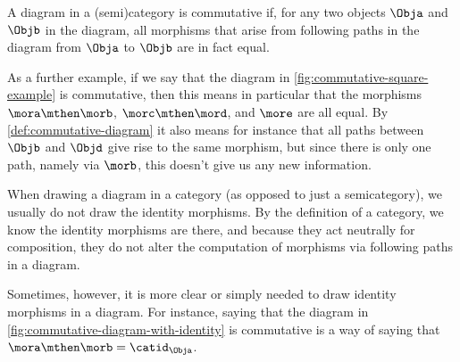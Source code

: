 \begin{marginfigure}
    \centering
    \caption{}
    \label{fig:commutative-diagram-example-prep}
\end{marginfigure}

\begin{marginfigure}
    \centering
    \caption{}
    \label{fig:commutative-diagram-example}
\end{marginfigure}

\begin{marginfigure}
    \centering
    \caption{}
    \label{fig:commutative-square-example}
\end{marginfigure}

\begin{marginfigure}
    \centering
    \caption{}
    \label{fig:commutative-diagram-with-identity}
\end{marginfigure}

\begin{definition}
    \label{def:commutative-diagram}
    A diagram in a (semi)category is commutative if, for any two objects $\Obja$ and $\Objb$ in the diagram, all morphisms that arise from following paths in the diagram from $\Obja$ to $\Objb$ are in fact equal.
\end{definition}

As a further example, if we say that the diagram in \cref{fig:commutative-square-example} is commutative, then this means in particular that the morphisms $\mora \mthen \morb$, $\morc \mthen \mord$, and $\more$ are all equal.
By \cref{def:commutative-diagram} it also means for instance that all paths between $\Objb$ and $\Objd$ give rise to the same morphism, but since there is only one path, namely via $\morb$, this doesn't give us any new information.

\begin{remark}
    When drawing a diagram in a category (as opposed to just a semicategory), we usually do not draw the identity morphisms.
    By the definition of a category, we know the identity morphisms are there, and because they act neutrally for composition, they do not alter the computation of morphisms via following paths in a diagram.

    Sometimes, however, it is more clear or simply needed to draw identity morphisms in a diagram.
    For instance, saying that the diagram in \cref{fig:commutative-diagram-with-identity} is commutative is a way of saying that $\mora \mthen \morb = \catid_{\Obja}$.
\end{remark}

